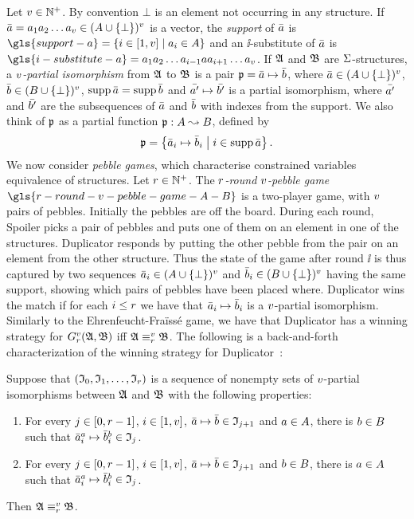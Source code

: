 Let $v \in \mathbb{N}^{+}$. By convention $\bot$ is an element not occurring in any
structure. If $\bar{a} = a_{1}a_{2}\dots a_{v} \in (A \cup
\left\{\bot\right\})^v$ is a vector, the \emph{support} of $\bar{a}$ is
$\gls{support-a} = \setbd{\ii \in [1,\nv]}{\eaa\ii \in \domA}$ and an
$\ii$-substitute of $\bar{a}$ is $\gls{i-substitute-a} =
\eaa1\eaa2\dots\eaa{\ii-1}\ea\eaa{\ii+1}\dots\eaa\nv$.
If $\mathfrak{A}$ and $\mathfrak{B}$ are $\mathrm{\Sigma}$-structures, a \emph{$v$-partial
isomorphism} from $\mathfrak{A}$ to $\mathfrak{B}$ is a pair $\mathfrak{p} = \bar{a} \mapsto
\bar{b}$, where $\bar{a} \in (A \cup \left\{\bot\right\})^v$,
$\bar{b} \in (B \cup \left\{\bot\right\})^v$, $\operatorname{supp} \bar{a} = \operatorname{supp} \bar{b}$
and $\bar{{a'}} \mapsto \bar{{b'}}$ is a partial isomorphism, where $\bar{{a'}}$
and $\bar{{b'}}$ are the subsequences of $\bar{a}$ and $\bar{b}$ with indexes
from the support. We also think of $\mathfrak{p}$ as a partial function
$\mathfrak{p} : A \leadsto B$, defined by
\[
  \mathfrak{p} = \left\{\bar{a}_i \mapsto \bar{b}_i\mathrel{}\middle|\mathrel{} i \in \operatorname{supp} \bar{a}\right\}.
\]
We now consider \emph{pebble games}, which characterise constrained variables
equivalence of structures.
Let $r \in \mathbb{N}^{+}$.
The \emph{$r$-round $v$-pebble game} $\gls{r-round-v-pebble-game-A-B}$ is a
two-player game, with $v$ pairs of pebbles.
Initially the pebbles are off the board.
During each round, Spoiler picks a pair of pebbles and puts one of them on an
element in one of the structures. Duplicator responds by putting the other
pebble from the pair on an element from the other structure.
Thus the state of the game after round $\ii$ is thus captured by two sequences
$\bar{a}_i \in (A \cup \left\{\bot\right\})^v$ and 
$\bar{b}_i \in (B \cup \left\{\bot\right\})^v$ having the same support, showing
which pairs of pebbles have been placed where.
Duplicator wins the match if for each $i \leq r$ we have that 
$\bar{a}_i \mapsto \bar{b}_i$ is a $v$-partial isomorphism.
Similarly to the Ehrenfeucht-Fra\"{i}ss\'{e} game, we have that Duplicator has a
winning strategy for $G_{r}^{v}(\mathfrak{A}, \mathfrak{B})$ iff $\mathfrak{A} \equiv_{r}^{v} \mathfrak{B}$.
The following is a back-and-forth characterization of the winning strategy for
Duplicator~\cite[ch. 2]{ebbinghaus1999finite}:
\begin{theorem}\label{thm:game-2}
Suppose that $(\mathfrak{I}_{0}, \mathfrak{I}_{1}, \dots, \mathfrak{I}_{r})$ is a sequence of nonempty
sets of $v$-partial isomorphisms between $\mathfrak{A}$ and $\mathfrak{B}$ with the
following properties:
\begin{enumerate}
  \item For every $j \in [0,r-1]$, $i \in [1,v]$,
  $\bar{a} \mapsto \bar{b} \in \mathfrak{I}_{j+1}$ and $a \in A$,
  there is $b \in B$ such that
  $\bar{a}_{i}^{a} \mapsto \bar{b}_{i}^{b} \in \mathfrak{I}_{j}$.
  \item For every $j \in [0,r-1]$, $i \in [1,v]$,
  $\bar{a} \mapsto \bar{b} \in \mathfrak{I}_{j+1}$ and $b \in B$,
  there is $a \in A$ such that
  $\bar{a}_{i}^{a} \mapsto \bar{b}_{i}^{b} \in \mathfrak{I}_{j}$.
\end{enumerate}
Then $\mathfrak{A} \equiv_{r}^{v} \mathfrak{B}$.
\end{theorem}